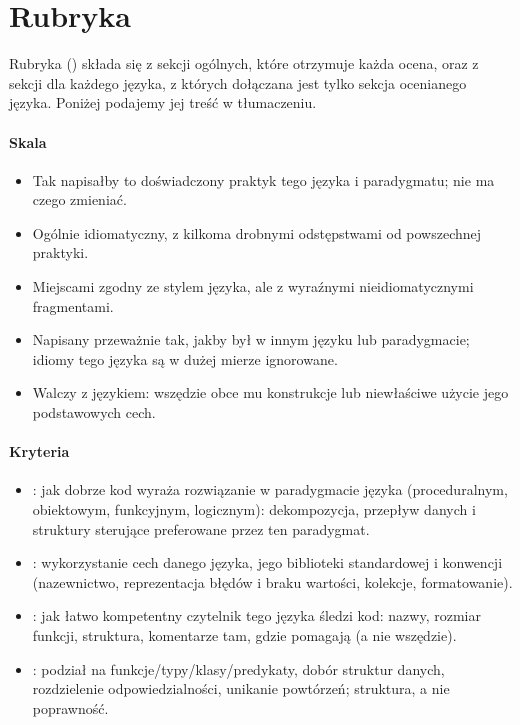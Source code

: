 \section{Rubryka}
\label{app:rubric}

Rubryka () składa się z sekcji ogólnych, które otrzymuje każda ocena, oraz
z sekcji dla każdego języka, z których dołączana jest tylko sekcja ocenianego języka. Poniżej
podajemy jej treść w tłumaczeniu.

\paragraph{Skala}
\begin{itemize}
  \item[\textbf{5}] Tak napisałby to doświadczony praktyk tego języka i paradygmatu; nie ma czego
    zmieniać.
  \item[\textbf{4}] Ogólnie idiomatyczny, z kilkoma drobnymi odstępstwami od powszechnej praktyki.
  \item[\textbf{3}] Miejscami zgodny ze stylem języka, ale z wyraźnymi nieidiomatycznymi
    fragmentami.
  \item[\textbf{2}] Napisany przeważnie tak, jakby był w innym języku lub paradygmacie; idiomy tego
    języka są w dużej mierze ignorowane.
  \item[\textbf{1}] Walczy z językiem: wszędzie obce mu konstrukcje lub niewłaściwe użycie jego
    podstawowych cech.
\end{itemize}

\paragraph{Kryteria}
\begin{itemize}
  \item {}: jak dobrze kod wyraża rozwiązanie w paradygmacie języka
    (proceduralnym, obiektowym, funkcyjnym, logicznym): dekompozycja, przepływ danych i struktury
    sterujące preferowane przez ten paradygmat.
  \item {}: wykorzystanie cech danego języka, jego biblioteki
    standardowej i konwencji (nazewnictwo, reprezentacja błędów i braku wartości, kolekcje,
    formatowanie).
  \item {}: jak łatwo kompetentny czytelnik tego języka śledzi kod: nazwy, rozmiar
    funkcji, struktura, komentarze tam, gdzie pomagają (a nie wszędzie).
  \item {}: podział na funkcje/typy/klasy/predykaty, dobór struktur danych, rozdzielenie
    odpowiedzialności, unikanie powtórzeń; struktura, a nie poprawność.
\end{itemize}

